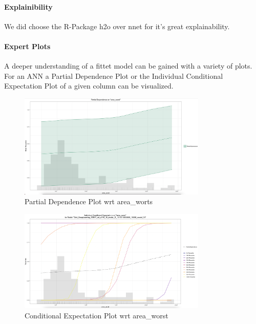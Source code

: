 \documentclass[]{article}
\let\oldparagraph\paragraph
\renewcommand{\paragraph}[1]{\oldparagraph{#1}\mbox{}}
\begin{document}
\paragraph{Explainibility}\label{explainibility}

We did choose the R-Package h2o over nnet for it's great explainability.

\paragraph{Expert Plots}\label{expert-plots}

A deeper understanding of a fittet model can be gained with a variety of
plots. For an ANN a Partial Dependence Plot or the Individual
Conditional Expectation Plot of a given column can be visualized.

\begin{figure}
    \centering
    \includegraphics[width=0.8\textwidth]{images/pd_plot.png}
    \caption{Partial Dependence Plot wrt area\_worts}
    \label{fig:pd_plot}
\end{figure}

\begin{figure}
    \centering
    \includegraphics[width=0.8\textwidth]{images/ice_plot.png}
    \caption{Conditional Expectation Plot wrt area\_worst}
    \label{fig:ice_plot}
\end{figure}
\end{document}
